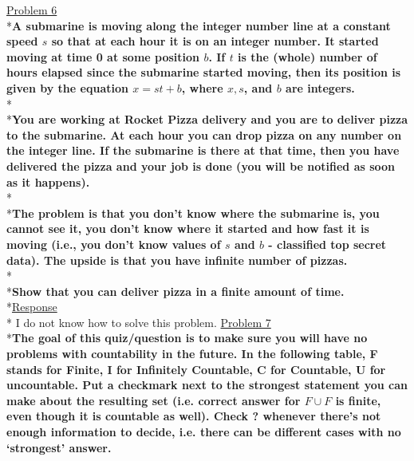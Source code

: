 \documentclass[12pt]{article}
\begin{document}
\noindent
\uline{Problem 6}
\\*\textbf{A submarine is moving along the integer number line at a constant speed $s$ so that at each hour it is on an integer number. It started moving at time 0 at some position $b$. If $t$ is the (whole) number of hours elapsed since the submarine started moving, then its position is given by the equation $x = st + b$, where $x, s$, and $b$ are integers.}
\\*\\*\textbf{You are working at Rocket Pizza delivery and you are to deliver pizza to the submarine. At each hour you can drop pizza on any number on the integer line. If the submarine is there at that time, then you have delivered the pizza and your job is done (you will be notified as soon as it happens).}
\\*\\*\textbf{The problem is that you don't know where the submarine is, you cannot see it, you don't know where it started and how fast it is moving (i.e., you don't know values of $s$ and $b$ - classified top secret data). The upside is that you have infinite number of pizzas.}
\\*\\*\textbf{Show that you can deliver pizza in a finite amount of time.}
\smallskip
\\*\uline{Response}
\\* I do not know how to solve this problem.
\newpage
\noindent
\uline{Problem 7}
\\*\textbf{The goal of this quiz/question is to make sure you will have no problems with countability in the future.
\bigskip
In the following table, F stands for Finite, I for Infinitely Countable, C for Countable, U for uncountable. Put a checkmark next
to the strongest statement you can make about the resulting set (i.e. correct answer for $F \cup F$ is finite, even though it is 
countable as well). Check \textbf{?} whenever there's not enough information to decide, i.e. there can be different cases with 
no `strongest' answer.}
\end{document}
